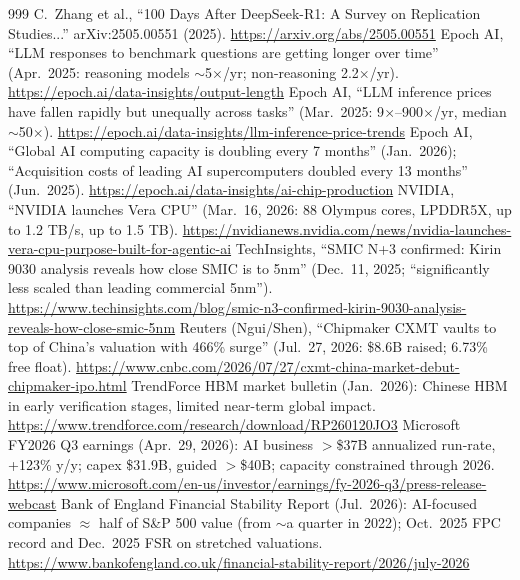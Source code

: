 \begin{thebibliography}{999}
 C.~Zhang et al., ``100 Days After DeepSeek-R1: A Survey on Replication Studies...'' arXiv:2505.00551 (2025). \url{https://arxiv.org/abs/2505.00551}
 Epoch AI, ``LLM responses to benchmark questions are getting longer over time'' (Apr.\ 2025: reasoning models $\sim$5$\times$/yr; non-reasoning 2.2$\times$/yr). \url{https://epoch.ai/data-insights/output-length}
 Epoch AI, ``LLM inference prices have fallen rapidly but unequally across tasks'' (Mar.\ 2025: 9$\times$--900$\times$/yr, median $\sim$50$\times$). \url{https://epoch.ai/data-insights/llm-inference-price-trends}
 Epoch AI, ``Global AI computing capacity is doubling every 7 months'' (Jan.\ 2026); ``Acquisition costs of leading AI supercomputers doubled every 13 months'' (Jun.\ 2025). \url{https://epoch.ai/data-insights/ai-chip-production}
 NVIDIA, ``NVIDIA launches Vera CPU'' (Mar.\ 16, 2026: 88 Olympus cores, LPDDR5X, up to 1.2 TB/s, up to 1.5 TB). \url{https://nvidianews.nvidia.com/news/nvidia-launches-vera-cpu-purpose-built-for-agentic-ai}
 TechInsights, ``SMIC N+3 confirmed: Kirin 9030 analysis reveals how close SMIC is to 5nm'' (Dec.\ 11, 2025; ``significantly less scaled than leading commercial 5nm''). \url{https://www.techinsights.com/blog/smic-n3-confirmed-kirin-9030-analysis-reveals-how-close-smic-5nm}
 Reuters (Ngui/Shen), ``Chipmaker CXMT vaults to top of China's valuation with 466\% surge'' (Jul.\ 27, 2026: \$8.6B raised; 6.73\% free float). \url{https://www.cnbc.com/2026/07/27/cxmt-china-market-debut-chipmaker-ipo.html}
 TrendForce HBM market bulletin (Jan.\ 2026): Chinese HBM in early verification stages, limited near-term global impact. \url{https://www.trendforce.com/research/download/RP260120JO3}
 Microsoft FY2026 Q3 earnings (Apr.\ 29, 2026): AI business $>$\$37B annualized run-rate, +123\% y/y; capex \$31.9B, guided $>$\$40B; capacity constrained through 2026. \url{https://www.microsoft.com/en-us/investor/earnings/fy-2026-q3/press-release-webcast}
 Bank of England Financial Stability Report (Jul.\ 2026): AI-focused companies $\approx$ half of S\&P 500 value (from $\sim$a quarter in 2022); Oct.\ 2025 FPC record and Dec.\ 2025 FSR on stretched valuations. \url{https://www.bankofengland.co.uk/financial-stability-report/2026/july-2026}


\end{thebibliography}
